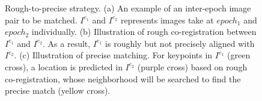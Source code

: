 \begin{figure}[htbp]
	\begin{center}
		\caption{ Rough-to-precise strategy. (a) An example of an inter-epoch image pair to be matched. $I^{e_1}$ and $I^{e_2}$ represents images take at $epoch_1$ and $epoch_2$ individually. (b) Illustration of rough co-registration between $I^{e_1}$ and $I^{e_2}$. As a result, $I^{e_1}$ is roughly but not precisely aligned with $I^{e_2}$. (c) Illustration of precise matching. For keypoints in $I^{e_1}$ (green cross), a location is predicted in $I^{e_2}$ (purple cross) based on rough co-registration, whose neighborhood will be searched to find the precise match (yellow cross).}
		\label{rough-to-precise}
	\end{center}
\end{figure}

